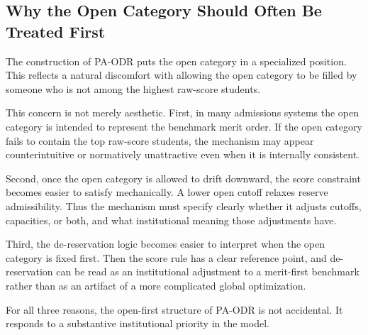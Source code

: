 \documentclass[runningheads]{llncs}
\newcommand{\1}{\mathbf{1}}
\begin{document}
\subsection{Why the Open Category Should Often Be Treated First}
The construction of PA-ODR puts the open category in a specialized position. This reflects a natural discomfort with allowing the open category to be filled by someone who is not among the highest raw-score students.

This concern is not merely aesthetic. First, in many admissions systems the open category is intended to represent the benchmark merit order. If the open category fails to contain the top raw-score students, the mechanism may appear counterintuitive or normatively unattractive even when it is internally consistent.

Second, once the open category is allowed to drift downward, the score constraint becomes easier to satisfy mechanically. A lower open cutoff relaxes reserve admissibility. Thus the mechanism must specify clearly whether it adjusts cutoffs, capacities, or both, and what institutional meaning those adjustments have.

Third, the de-reservation logic becomes easier to interpret when the open category is fixed first. Then the score rule has a clear reference point, and de-reservation can be read as an institutional adjustment to a merit-first benchmark rather than as an artifact of a more complicated global optimization.

For all three reasons, the open-first structure of PA-ODR is not accidental. It responds to a substantive institutional priority in the model.


\end{document}

